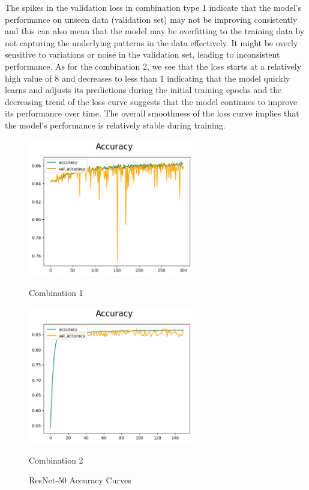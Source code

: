 The spikes in the validation loss in combination type 1 indicate that the model's performance on unseen data (validation set) may not be improving consistently and this can also mean that the model may be overfitting to the training data by not capturing the underlying patterns in the data effectively. It might be overly sensitive to variations or noise in the validation set, leading to inconsistent performance. As for the combination 2, we see that the loss starts at a relatively high value of 8 and decreases to less than 1 indicating that the model quickly learns and adjusts its predictions during the initial training epochs and the decreasing trend of the loss curve suggests that the model continues to improve its performance over time. The overall smoothness of the loss curve implies that the model's performance is relatively stable during training.

\begin{figure}[H]
    \centering
    \begin{minipage}[b]{0.49\textwidth}
        \centering
        \includegraphics[width=\textwidth, height=6cm]{Figures/unbalanced_data/without bn/resnet/accuracy.png}
        \captionsetup{labelformat=empty}
        \caption{Combination 1}
        \label{fig:u_wo_r_a}
    \end{minipage}
    \hfill
    \begin{minipage}[b]{0.49\textwidth}
        \centering
        \includegraphics[width=\textwidth, height=6cm]{Figures/unbalanced_data/with bn/resnet/accuracy.png}
        \captionsetup{labelformat=empty}
        \caption{Combination 2}
        \label{fig:u_w_r_a}
    \end{minipage}
    \captionsetup{labelformat=default}
    \caption{ResNet-50 Accuracy Curves}
\end{figure}


